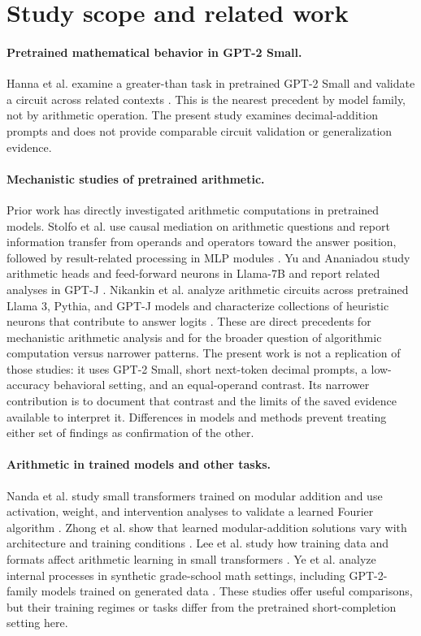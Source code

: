 \documentclass[11pt]{article}
\begin{document}
\section{Study scope and related work}

\paragraph{Pretrained mathematical behavior in GPT-2 Small.} Hanna et al. examine a greater-than task in pretrained GPT-2 Small and validate a circuit across related contexts \cite{hanna2023greater}. This is the nearest precedent by model family, not by arithmetic operation. The present study examines decimal-addition prompts and does not provide comparable circuit validation or generalization evidence.

\paragraph{Mechanistic studies of pretrained arithmetic.} Prior work has directly investigated arithmetic computations in pretrained models. Stolfo et al. use causal mediation on arithmetic questions and report information transfer from operands and operators toward the answer position, followed by result-related processing in MLP modules \cite{stolfo2023causal}. Yu and Ananiadou study arithmetic heads and feed-forward neurons in Llama-7B and report related analyses in GPT-J \cite{yu2024cna}. Nikankin et al. analyze arithmetic circuits across pretrained Llama 3, Pythia, and GPT-J models and characterize collections of heuristic neurons that contribute to answer logits \cite{nikankin2025heuristics}. These are direct precedents for mechanistic arithmetic analysis and for the broader question of algorithmic computation versus narrower patterns. The present work is not a replication of those studies: it uses GPT-2 Small, short next-token decimal prompts, a low-accuracy behavioral setting, and an equal-operand contrast. Its narrower contribution is to document that contrast and the limits of the saved evidence available to interpret it. Differences in models and methods prevent treating either set of findings as confirmation of the other.

\paragraph{Arithmetic in trained models and other tasks.} Nanda et al. study small transformers trained on modular addition and use activation, weight, and intervention analyses to validate a learned Fourier algorithm \cite{nanda2023progress}. Zhong et al. show that learned modular-addition solutions vary with architecture and training conditions \cite{zhong2023clock}. Lee et al. study how training data and formats affect arithmetic learning in small transformers \cite{lee2024teaching}. Ye et al. analyze internal processes in synthetic grade-school math settings, including GPT-2-family models trained on generated data \cite{ye2024physics}. These studies offer useful comparisons, but their training regimes or tasks differ from the pretrained short-completion setting here.
\end{document}
